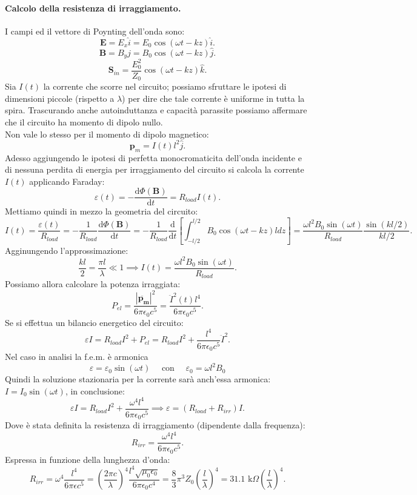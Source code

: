 \paragraph{Calcolo della resistenza di irraggiamento.}
I campi ed il vettore di Poynting dell'onda sono:
\[
	\boldsymbol{E} = E_x \hat{i} = E_0 \cos\left( \omega t - kz \right) \hat{i} 
.\] 
\[
	\boldsymbol{B} = B_y \hat{j} = B_0 \cos\left( \omega t - kz \right) \hat{j} 
.\] 
\[
	\boldsymbol{S}_{in} = \frac{E_0^2}{Z_0}\cos\left( \omega t - kz \right) \hat{k} 
.\] 
Sia $I\left( t \right) $ la corrente che scorre nel circuito; possiamo sfruttare le ipotesi di dimensioni piccole (rispetto a $\lambda$) per dire che tale corrente è uniforme in tutta la spira. Trascurando anche autoinduttanza e capacità parassite possiamo affermare che il circuito ha momento di dipolo nullo.\\
Non vale lo stesso per il momento di dipolo magnetico:
\[
	\boldsymbol{p}_m = I\left( t \right) l^2 \hat{j}
.\] 
Adesso aggiungendo le ipotesi di perfetta monocromaticita dell'onda incidente e di nessuna perdita di energia per irraggiamento del circuito si calcola la corrente $I\left( t \right)$ applicando Faraday:   
\[
	\varepsilon\left( t \right) = - \frac{\mbox{d} \Phi\left( \boldsymbol{B} \right) }{\mbox{d} t} = R_{load} I\left( t \right) 
.\]
Mettiamo quindi in mezzo la geometria del circuito:
\[
	I\left( t \right) = \frac{\varepsilon\left( t \right)}{R_{load}} = 
	- \frac{1}{R_{load}} \frac{\mbox{d} \Phi\left( \boldsymbol{B} \right) }{\mbox{d} t} 
	= - \frac{1}{R_{load}} \frac{\mbox{d}}{\mbox{d}t} \left[ \int_{-l/2}^{l/2} B_0 \cos\left( \omega t - kz \right) l dz \right] 
	= \frac{\omega l^2B_0\sin\left( \omega t\right)}{R_{load}} \frac{\sin\left( kl/2 \right)}{kl/2}      
.\] 
Agginungendo l'approssimazione:
\[
	\frac{kl}{2} = \frac{\pi l}{\lambda} \ll 1 \implies I\left( t \right) = \frac{\omega l^2 B_0 \sin\left( \omega t \right) }{R_{load}}  
.\] 
Possiamo allora calcolare la potenza irraggiata:
\[
	P_{el} = \frac{\left| \ddot{\boldsymbol{p_m}} \right| ^2}{6\pi \epsilon_0 c^{5}} = \frac{\ddot{I}^2\left( t \right) l^4}{6\pi \epsilon_0 c^5}
.\] 
Se si effettua un bilancio energetico del circuito:
\[
	\varepsilon I = R_{load}I^2 + P_{el} = R_{load} I^2 + \frac{l^4}{6\pi \epsilon_0 c^5}\ddot{I}^2
.\] 
Nel caso in analisi la f.e.m. è armonica 
\[
	\varepsilon = \varepsilon_0 \sin\left( \omega t \right) \quad 
	\text{ con } \quad  
	\varepsilon_0 = \omega l^2 B_0
\]
Quindi la soluzione stazionaria per la corrente sarà anch'essa armonica: $I = I_0 \sin\left( \omega t \right) $, in conclusione:
\[
	\varepsilon I = R_{load}I^2 + \frac{\omega ^{4}l^{4}}{6\pi \epsilon_0 c^{5}} \implies \varepsilon = \left( R_{load} + R_{irr} \right) I
.\] 
Dove è stata definita la resistenza di irraggiamento (dipendente dalla frequenza):
\[
	R_{irr} = \frac{\omega^4l^4}{6\pi \epsilon_0 c^5}
.\]
Espressa in funzione della lunghezza d'onda:
\[
	R_{irr} = \omega^4 \frac{l^4}{6\pi \epsilon c^5} = \left( \frac{2\pi c}{\lambda} \right) ^4 \frac{l^4\sqrt{\mu_0 \epsilon_0} }{6 \pi \epsilon_0 c^4} = \frac{8}{3}\pi^3 Z_0\left( \frac{l}{\lambda} \right)^4 = 31.1 \text{ k}\Omega \left( \frac{l}{\lambda} \right)^4  
.\] 
